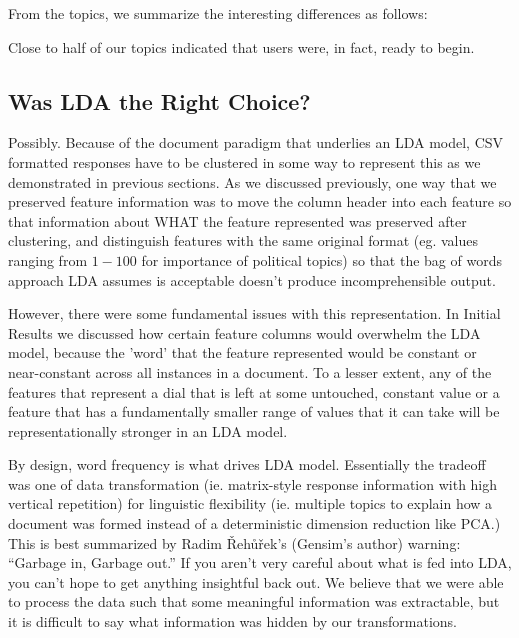 From the topics, we summarize the interesting differences as follows:
\begin{list}
\item Close to half of our topics indicated that users were, in fact, ready to begin.
\item 
\end{list}



\subsection{Was LDA the Right Choice?}
Possibly. Because of the document paradigm that underlies an LDA model, CSV formatted responses have to be clustered in some way to represent this as we demonstrated in previous sections. As we discussed previously, one way that we preserved feature information was to move the column header into each feature so that information about WHAT the feature represented was preserved after clustering, and distinguish features with the same original format (eg. values ranging from $1 - 100$ for importance of political topics) so that the bag of words approach LDA assumes is acceptable doesn't produce incomprehensible output.

However, there were some fundamental issues with this representation. In Initial Results we discussed how certain feature columns would overwhelm the LDA model, because the 'word' that the feature represented would be constant or near-constant across all instances in a document. To a lesser extent, any of the features that represent a dial that is left at some untouched, constant value or a feature that has a fundamentally smaller range of values that it can take will be representationally stronger in an LDA model.

By design, word frequency is what drives LDA model. Essentially the tradeoff was one of data transformation (ie. matrix-style response information with high vertical repetition) for linguistic flexibility (ie. multiple topics to explain how a document was formed instead of a deterministic dimension reduction like PCA.)\\

This is best summarized by Radim Řehůřek's (Gensim's author) warning: ``Garbage in, Garbage out.'' If you aren't very careful about what is fed into LDA, you can't hope to get anything insightful back out. We believe that we were able to process the data such that some meaningful information was extractable, but it is difficult to say what information was hidden by our transformations.


